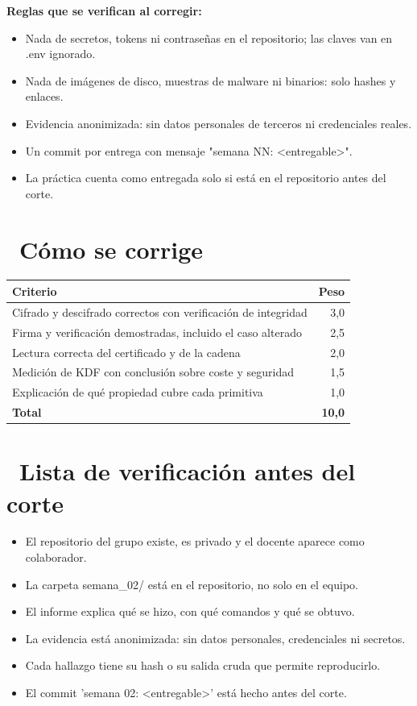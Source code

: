 \documentclass[11pt,a4paper]{article}
\newcommand{\iconotexto}[2]{\textcolor{cyanNeon}{\faIcon{#1}}~#2}
\begin{document}
\textbf{Reglas que se verifican al corregir:}

\begin{itemize}[leftmargin=1.4em,itemsep=2pt,topsep=3pt]
  \item Nada de secretos, tokens ni contraseñas en el repositorio; las claves van en .env ignorado.
  \item Nada de imágenes de disco, muestras de malware ni binarios: solo hashes y enlaces.
  \item Evidencia anonimizada: sin datos personales de terceros ni credenciales reales.
  \item Un commit por entrega con mensaje "semana NN: \textless{}entregable\textgreater{}".
  \item La práctica cuenta como entregada solo si está en el repositorio antes del corte.
\end{itemize}

\section{\iconotexto{ruler-combined}{Cómo se corrige}}

\begin{tabularx}{\linewidth}{@{}X r@{}}
\toprule
Criterio & Peso\\
\midrule
Cifrado y descifrado correctos con verificación de integridad & 3,0 \\
Firma y verificación demostradas, incluido el caso alterado & 2,5 \\
Lectura correcta del certificado y de la cadena & 2,0 \\
Medición de KDF con conclusión sobre coste y seguridad & 1,5 \\
Explicación de qué propiedad cubre cada primitiva & 1,0 \\
\midrule
\textbf{Total} & \textbf{10,0}\\
\bottomrule
\end{tabularx}

\section{\iconotexto{clipboard-check}{Lista de verificación antes del corte}}

\begin{itemize}[leftmargin=1.4em,itemsep=2pt,topsep=3pt]
  \item El repositorio del grupo existe, es privado y el docente aparece como colaborador.
  \item La carpeta semana\_02/ está en el repositorio, no solo en el equipo.
  \item El informe explica qué se hizo, con qué comandos y qué se obtuvo.
  \item La evidencia está anonimizada: sin datos personales, credenciales ni secretos.
  \item Cada hallazgo tiene su hash o su salida cruda que permite reproducirlo.
  \item El commit 'semana 02: \textless{}entregable\textgreater{}' está hecho antes del corte.
\end{itemize}
\end{document}
